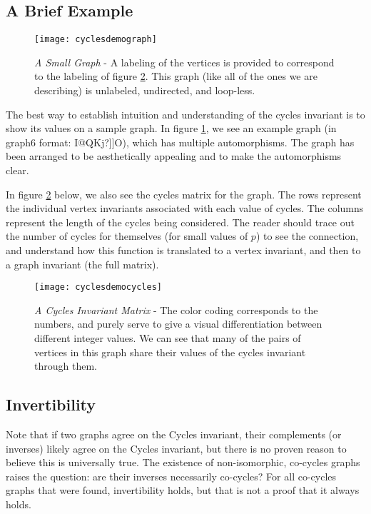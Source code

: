 \subsection{A Brief Example}

\begin{figure}[h]
\caption{\emph{A Small Graph} - A labeling of the vertices is provided to correspond to the labeling of figure \ref{fig:cyclesdemocycles}. This graph (like all of the ones we are describing) is unlabeled, undirected, and loop-less.}
\centering
\texttt{[image: cyclesdemograph]}
\label{fig:cyclesdemograph}
\end{figure}

The best way to establish intuition and understanding of the cycles invariant is to show its values on a sample graph.
In figure \ref{fig:cyclesdemograph}, we see an example graph (in graph6 format: I@QKj?]]O), which has multiple automorphisms.
The graph has been arranged to be aesthetically appealing and to make the automorphisms clear.

In figure \ref{fig:cyclesdemocycles} below, we also see the cycles matrix for the graph.
The rows represent the individual vertex invariants associated with each value of cycles.
The columns represent the length of the cycles being considered.
The reader should trace out the number of cycles for themselves (for small values of $p$) to see the connection, and understand how this function is translated to a vertex invariant, and then to a graph invariant (the full matrix).

\begin{figure}[h]
\caption{\emph{A Cycles Invariant Matrix} - The color coding corresponds to the numbers, and purely serve to give a visual differentiation between different integer values.  We can see that many of the pairs of vertices in this graph share their values of the cycles invariant through them.}
\centering
\texttt{[image: cyclesdemocycles]}
\label{fig:cyclesdemocycles}
\end{figure}

\subsection{Invertibility}
Note that if two graphs agree on the Cycles invariant, their complements (or inverses) likely agree on the Cycles invariant, but there is no proven reason to believe this is universally true.
The existence of non-isomorphic, co-cycles graphs raises the question: are their inverses necessarily co-cycles?
For all co-cycles graphs that were found, invertibility holds, but that is not a proof that it always holds.


